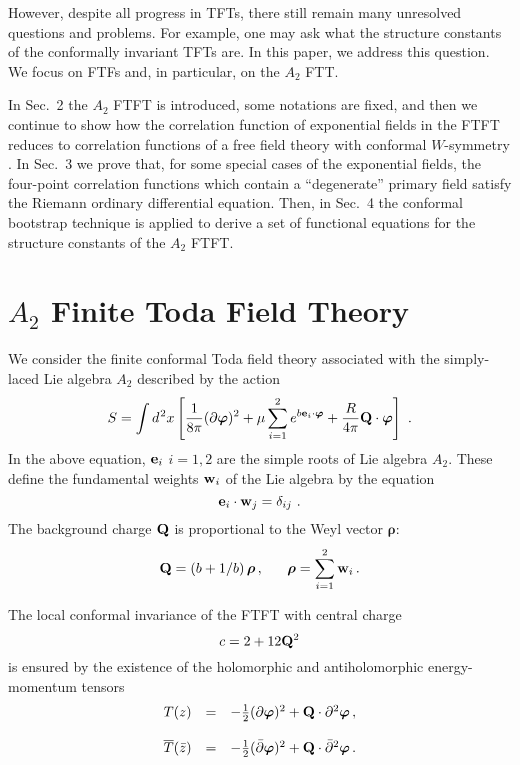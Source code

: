 \documentclass[a4paper,12pt]{article}
\newcommand{\bm}{\boldsymbol}
\begin{document}
However, despite all progress in TFTs, there still remain
many unresolved questions and problems. For example, one may ask
what the structure constants of the conformally invariant TFTs are.
In this paper, we address this question. We focus on FTFs and, in particular,
on the $A_2$ FTT.

In Sec.~2 the
$A_2$ FTFT is introduced, some notations are fixed, and then we
continue to show how the correlation function of exponential
fields in the FTFT reduces to correlation functions of a free
field theory with conformal $W$-symmetry \cite{Bilal,BS,FZ,LF}. 
In Sec.~3 we prove that, for some special cases of the
exponential fields, the four-point correlation functions which
contain  a ``degenerate'' primary field satisfy the Riemann
ordinary differential equation.
Then, in Sec.~4 the conformal bootstrap technique is applied to
derive a set of functional equations for the structure constants of the
$A_2$ FTFT.

\section{$A_2$ Finite Toda Field Theory}
We consider the finite conformal Toda field theory associated with
the simply-laced Lie algebra $A_2$  described by the action
\begin{equation}	
S=\int d^{\kern0.6pt 2}x
\left[\frac{1}{8\pi}(\partial{\bm\varphi})^2+\mu
\sum^2_{i=1} e^{b{\bf e}_i\cdot{\bm\varphi}}
+\frac{R}{4\pi}{\bf Q}\cdot{\bm\varphi}\right]~.
\label{eq:1}
\end{equation}
In the above equation,  ${\bf e}_i$ $i=1,2$ are the simple roots of Lie algebra
$A_2$. These define the fundamental weights
${\bf w}_i$ of the Lie algebra by the equation
$$
 {\bf e}_i \cdot {\bf w}_j=\delta_{ij}~.
$$
The background charge ${\bf Q}$ is proportional to the Weyl vector ${\bm\rho}$:
$$
{\bf Q}=(b+1/b)\, {\bm\rho}\, ,~~~~~
{\bm\rho}=\displaystyle\sum^2_{i=1} {\bf w}_i\, .
$$

The local conformal invariance of the FTFT with 
central charge
$$
c=2+12{\bf Q}^2
$$
is ensured by the existence of the holomorphic and antiholomorphic 
energy-momentum tensors
\begin{eqnarray*}
\begin{array}{rcl}
T(z) &=&-{1\over2}(\partial{\bm\varphi})^2
+{\bf Q}\cdot\partial^2{\bm\varphi}\,,\\[13pt]
\overline T(\bar z) &=&-{1\over2}(\bar\partial{\bm\varphi})^2
+{\bf Q}\cdot\bar\partial^2{\bm\varphi}\,.
\end{array}
\end{eqnarray*}
\end{document}
